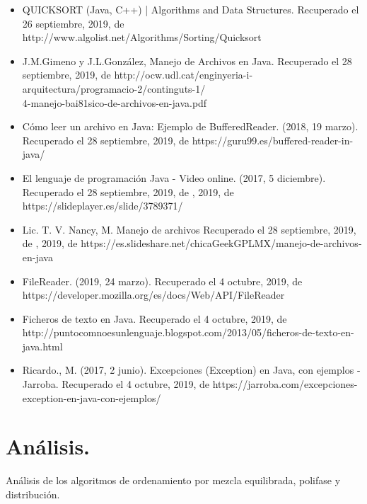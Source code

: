 \documentclass[12pt,letterpaper]{report}
\begin{document}
\begin{center}
\begin{itemize}
	\item QUICKSORT (Java, C++) | Algorithms and Data Structures. Recuperado el 26 septiembre, 2019, de http://www.algolist.net/Algorithms/Sorting/Quicksort
	\item J.M.Gimeno y J.L.González, Manejo de Archivos en Java. Recuperado el 28 septiembre, 2019, de http://ocw.udl.cat/enginyeria-i-arquitectura/programacio-2/continguts-1/\\4-manejo-bai81sico-de-archivos-en-java.pdf
	\item Cómo leer un archivo en Java: Ejemplo de BufferedReader. (2018, 19 marzo). Recuperado el 28 septiembre, 2019, de  https://guru99.es/buffered-reader-in-java/
	\item El lenguaje de programación Java - Video online. (2017, 5 diciembre). Recuperado el 28 septiembre, 2019, de , 2019, de https://slideplayer.es/slide/3789371/
	\item Lic. T. V. Nancy, M. Manejo de archivos Recuperado el 28 septiembre, 2019, de , 2019, de https://es.slideshare.net/chicaGeekGPLMX/manejo-de-archivos-en-java
	\item FileReader. (2019, 24 marzo). Recuperado el 4 octubre, 2019, de \\ https://developer.mozilla.org/es/docs/Web/API/FileReader
	\item Ficheros de texto en Java. Recuperado el 4 octubre, 2019, de \\ http://puntocomnoesunlenguaje.blogspot.com/2013/05/ficheros-de-texto-en-java.html
	\item Ricardo., M. (2017, 2 junio). Excepciones (Exception) en Java, con ejemplos - Jarroba. Recuperado el 4 octubre, 2019, de https://jarroba.com/excepciones-exception-en-java-con-ejemplos/
\end{itemize}
\end{center}
\clearpage
\section*{\centering \LARGE Análisis.}
Análisis de los algoritmos de ordenamiento por mezcla equilibrada, polifase y distribución.
\end{document}
